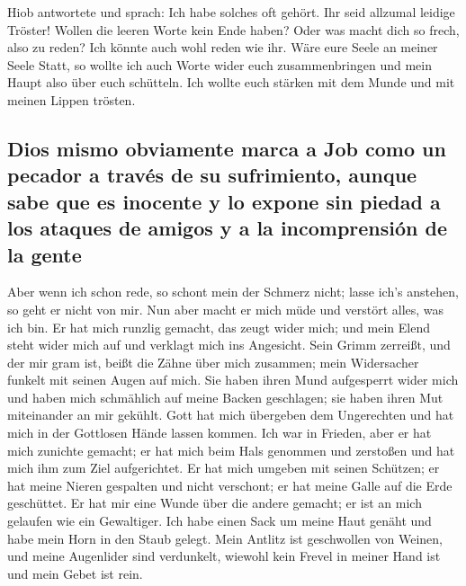  Hiob antwortete und sprach:  Ich habe
solches oft gehört. Ihr seid allzumal leidige Tröster! 
Wollen die leeren Worte kein Ende haben? Oder was macht dich so frech,
also zu reden?  Ich könnte auch wohl reden wie ihr. Wäre
eure Seele an meiner Seele Statt, so wollte ich auch Worte wider euch
zusammenbringen und mein Haupt also über euch schütteln. 
Ich wollte euch stärken mit dem Munde und mit meinen Lippen trösten.

\hypertarget{dios-mismo-obviamente-marca-a-job-como-un-pecador-a-travuxe9s-de-su-sufrimiento-aunque-sabe-que-es-inocente-y-lo-expone-sin-piedad-a-los-ataques-de-amigos-y-a-la-incomprensiuxf3n-de-la-gente}{%
\subsection{Dios mismo obviamente marca a Job como un pecador a través
de su sufrimiento, aunque sabe que es inocente y lo expone sin piedad a
los ataques de amigos y a la incomprensión de la
gente}\label{dios-mismo-obviamente-marca-a-job-como-un-pecador-a-travuxe9s-de-su-sufrimiento-aunque-sabe-que-es-inocente-y-lo-expone-sin-piedad-a-los-ataques-de-amigos-y-a-la-incomprensiuxf3n-de-la-gente}}

 Aber wenn ich schon rede, so schont mein der Schmerz
nicht; lasse ich's anstehen, so geht er nicht von mir. 
Nun aber macht er mich müde und verstört alles, was ich bin.
 Er hat mich runzlig gemacht, das zeugt wider mich; und
mein Elend steht wider mich auf und verklagt mich ins Angesicht.
 Sein Grimm zerreißt, und der mir gram ist, beißt die
Zähne über mich zusammen; mein Widersacher funkelt mit seinen Augen auf
mich.  Sie haben ihren Mund aufgesperrt wider mich und
haben mich schmählich auf meine Backen geschlagen; sie haben ihren Mut
miteinander an mir gekühlt.  Gott hat mich übergeben dem
Ungerechten und hat mich in der Gottlosen Hände lassen kommen.
 Ich war in Frieden, aber er hat mich zunichte gemacht;
er hat mich beim Hals genommen und zerstoßen und hat mich ihm zum Ziel
aufgerichtet.  Er hat mich umgeben mit seinen Schützen;
er hat meine Nieren gespalten und nicht verschont; er hat meine Galle
auf die Erde geschüttet.  Er hat mir eine Wunde über die
andere gemacht; er ist an mich gelaufen wie ein Gewaltiger.
 Ich habe einen Sack um meine Haut genäht und habe mein
Horn in den Staub gelegt.  Mein Antlitz ist geschwollen
von Weinen, und meine Augenlider sind verdunkelt, 
wiewohl kein Frevel in meiner Hand ist und mein Gebet ist rein.

